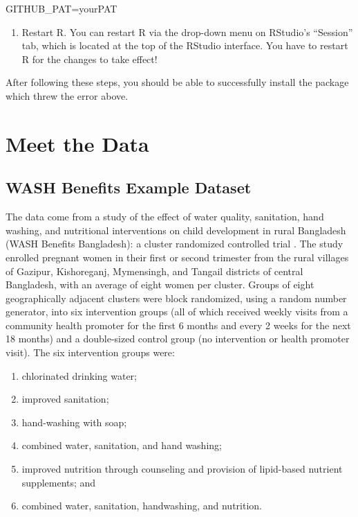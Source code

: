 \documentclass[12pt, krantz2,]{book}
\newenvironment{Shaded}{\begin{snugshade}}{\end{snugshade}}
\newcommand{\NormalTok}[1]{#1}
\providecommand{\tightlist}{%
  \setlength{\itemsep}{0pt}\setlength{\parskip}{0pt}}
\theoremstyle{definition}
\theoremstyle{definition}
\theoremstyle{definition}
\newcommand{\1}{\mathbbm{1}}
\begin{document}
\begin{Shaded}
\begin{Highlighting}[]
\NormalTok{GITHUB_PAT=yourPAT}
\end{Highlighting}
\end{Shaded}

\begin{enumerate}
\def\labelenumi{\arabic{enumi}.}
\setcounter{enumi}{7}
\tightlist
\item
  Restart R. You can restart R via the drop-down menu on RStudio's ``Session''
  tab, which is located at the top of the RStudio interface. You have to
  restart R for the changes to take effect!
\end{enumerate}

After following these steps, you should be able to successfully install the
package which threw the error above.

\hypertarget{data}{%
\chapter{Meet the Data}\label{data}}

\hypertarget{wash}{%
\section{WASH Benefits Example Dataset}\label{wash}}

The data come from a study of the effect of water quality, sanitation, hand
washing, and nutritional interventions on child development in rural Bangladesh
(WASH Benefits Bangladesh): a cluster randomized controlled trial
\citep{luby2018effect}. The study enrolled pregnant women in their first or second
trimester from the rural villages of Gazipur, Kishoreganj, Mymensingh, and
Tangail districts of central Bangladesh, with an average of eight women per
cluster. Groups of eight geographically adjacent clusters were block randomized,
using a random number generator, into six intervention groups (all of which
received weekly visits from a community health promoter for the first 6 months
and every 2 weeks for the next 18 months) and a double-sized control group (no
intervention or health promoter visit). The six intervention groups were:

\begin{enumerate}
\def\labelenumi{\arabic{enumi}.}
\tightlist
\item
  chlorinated drinking water;
\item
  improved sanitation;
\item
  hand-washing with soap;
\item
  combined water, sanitation, and hand washing;
\item
  improved nutrition through counseling and provision of lipid-based nutrient
  supplements; and
\item
  combined water, sanitation, handwashing, and nutrition.
\end{enumerate}
\end{document}
